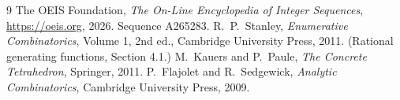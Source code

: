 \documentclass[11pt,a4paper]{article}
\theoremstyle{plain}
\theoremstyle{definition}
\begin{document}
\begin{thebibliography}{9}
 The OEIS Foundation, \emph{The On-Line Encyclopedia of Integer
Sequences}, \url{https://oeis.org}, 2026. Sequence A265283.
 R.~P.~Stanley, \emph{Enumerative Combinatorics}, Volume 1, 2nd ed.,
Cambridge University Press, 2011. (Rational generating functions, Section 4.1.)
 M.~Kauers and P.~Paule, \emph{The Concrete Tetrahedron}, Springer, 2011.
 P.~Flajolet and R.~Sedgewick, \emph{Analytic Combinatorics}, Cambridge
University Press, 2009.
\end{thebibliography}
\end{document}
